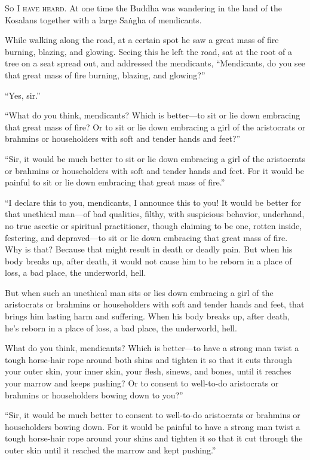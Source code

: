 \documentclass[12pt,openany]{book}%
\newcommand*{\scevam}[1]{\textsc{#1}}
\begin{document}
\scevam{So I have heard. }At one time the Buddha was wandering in the land of the Kosalans together with a large \textsanskrit{Saṅgha} of mendicants. 

While walking along the road, at a certain spot he saw a great mass of fire burning, blazing, and glowing. Seeing this he left the road, sat at the root of a tree on a seat spread out, and addressed the mendicants, “Mendicants, do you see that great mass of fire burning, blazing, and glowing?” 

“Yes, sir.” 

“What do you think, mendicants? Which is better—to sit or lie down embracing that great mass of fire? Or to sit or lie down embracing a girl of the aristocrats or brahmins or householders with soft and tender hands and feet?” 

“Sir, it would be much better to sit or lie down embracing a girl of the aristocrats or brahmins or householders with soft and tender hands and feet. For it would be painful to sit or lie down embracing that great mass of fire.” 

“I declare this to you, mendicants, I announce this to you! It would be better for that unethical man—of bad qualities, filthy, with suspicious behavior, underhand, no true ascetic or spiritual practitioner, though claiming to be one, rotten inside, festering, and depraved—to sit or lie down embracing that great mass of fire. Why is that? Because that might result in death or deadly pain. But when his body breaks up, after death, it would not cause him to be reborn in a place of loss, a bad place, the underworld, hell. 

But when such an unethical man sits or lies down embracing a girl of the aristocrats or brahmins or householders with soft and tender hands and feet, that brings him lasting harm and suffering. When his body breaks up, after death, he’s reborn in a place of loss, a bad place, the underworld, hell. 

What do you think, mendicants? Which is better—to have a strong man twist a tough horse-hair rope around both shins and tighten it so that it cuts through your outer skin, your inner skin, your flesh, sinews, and bones, until it reaches your marrow and keeps pushing? Or to consent to well-to-do aristocrats or brahmins or householders bowing down to you?” 

“Sir, it would be much better to consent to well-to-do aristocrats or brahmins or householders bowing down. For it would be painful to have a strong man twist a tough horse-hair rope around your shins and tighten it so that it cut through the outer skin until it reached the marrow and kept pushing.” 
\end{document}
